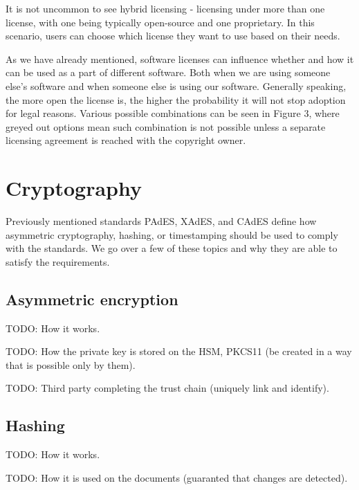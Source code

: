 \documentclass[thesismargins, english, thesislinespacing, twoside, openright, upjsfrontpage]{rnthesis}
\begin{document}
It is not uncommon to see hybrid licensing - licensing under more than one license, with one being typically open-source and one proprietary.
In this scenario, users can choose which license they want to use based on their needs.


As we have already mentioned, software licenses can influence whether and how it can be used as a part of different software.
Both when we are using someone else's software and when someone else is using our software.
Generally speaking, the more open the license is, the higher the probability it will not stop adoption for legal reasons.
Various possible combinations can be seen in Figure 3, where greyed out options mean such combination is not possible unless a separate licensing agreement is reached with the copyright owner.


\newpage

\section{Cryptography}

Previously mentioned standards PAdES, XAdES, and CAdES define how asymmetric cryptography, hashing, or timestamping should be used to comply with the standards.
We go over a few of these topics and why they are able to satisfy the requirements.

\subsection{Asymmetric encryption}

TODO: How it works.

TODO: How the private key is stored on the HSM, PKCS11 (be created in a way that is possible only by them).

TODO: Third party completing the trust chain (uniquely link and identify).

\subsection{Hashing}

TODO: How it works.

TODO: How it is used on the documents (guaranted that changes are detected).
\end{document}
